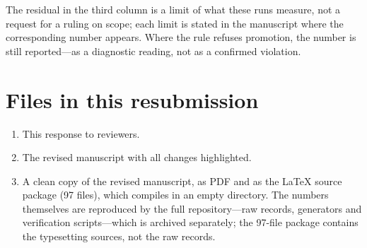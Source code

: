 \documentclass[10pt,letterpaper]{article}
\begin{document}
\noindent The residual in the third column is a limit of what these runs measure,
not a request for a ruling on scope; each limit is stated in the manuscript where
the corresponding number appears. Where
the rule refuses promotion, the number is still reported---as a diagnostic
reading, not as a confirmed violation.

\section{Files in this resubmission}

\begin{enumerate}
\item This response to reviewers.
\item The revised manuscript with all changes highlighted.
\item A clean copy of the revised manuscript, as PDF and as the LaTeX source
package (97 files), which compiles in an empty directory. The numbers
themselves are reproduced by the full repository---raw records, generators and
verification scripts---which is archived separately; the 97-file package
contains the typesetting sources, not the raw records.
\end{enumerate}
\end{document}
